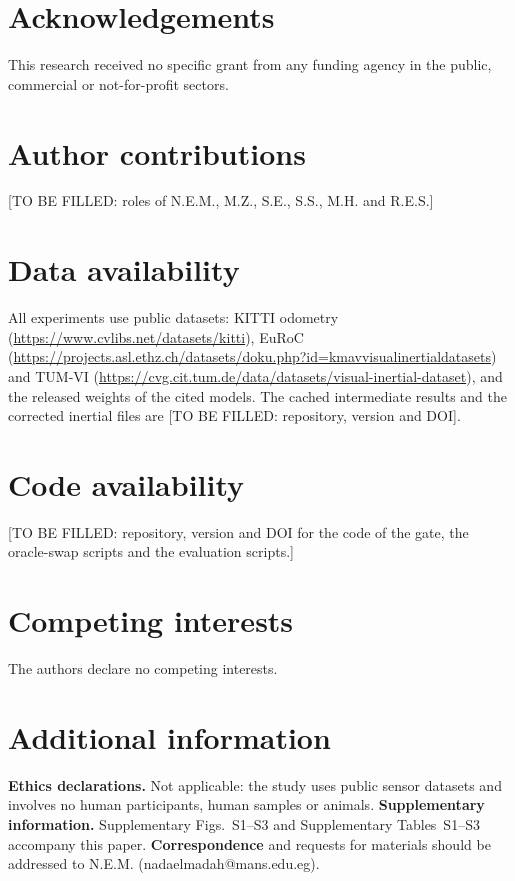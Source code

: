 \documentclass[pdflatex,sn-nature]{sn-jnl}
\newcommand{\tbf}[1]{\textbf{#1}}
\begin{document}
\section{Acknowledgements}
This research received no specific grant from any funding agency in the public, commercial or not-for-profit sectors.

\section{Author contributions}
[TO BE FILLED: roles of N.E.M., M.Z., S.E., S.S., M.H. and R.E.S.]

\section{Data availability}
\raggedright
All experiments use public datasets: KITTI odometry (\url{https://www.cvlibs.net/datasets/kitti}), EuRoC (\url{https://projects.asl.ethz.ch/datasets/doku.php?id=kmavvisualinertialdatasets}) and TUM-VI (\url{https://cvg.cit.tum.de/data/datasets/visual-inertial-dataset}), and the released weights of the cited models. The cached intermediate results and the corrected inertial files are [TO BE FILLED: repository, version and DOI].

\section{Code availability}
\raggedright
[TO BE FILLED: repository, version and DOI for the code of the gate, the oracle-swap scripts and the evaluation scripts.]

\section{Competing interests}
The authors declare no competing interests.

\section{Additional information}
\tbf{Ethics declarations.} Not applicable: the study uses public sensor datasets and involves no human participants, human samples or animals. \tbf{Supplementary information.} Supplementary Figs.~S1--S3 and Supplementary Tables~S1--S3 accompany this paper. \tbf{Correspondence} and requests for materials should be addressed to N.E.M. (nadaelmadah@mans.edu.eg).

{ }
\end{document}
